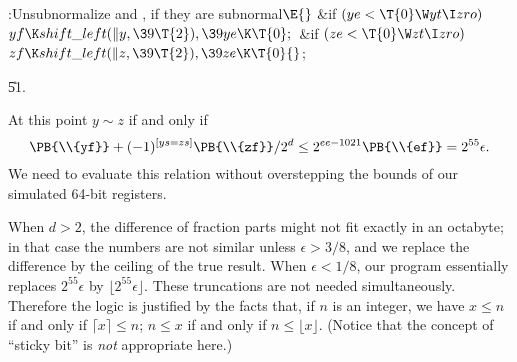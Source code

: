 \B{}:Unsubnormalize  and , if they are subnormal\X${}%
\E{}$\6
\&{if} ${}(\\{ye}<\T{0}\W\\{yt}\I\\{zro}){}$\1\5
${}\\{yf}\K\\{shift\_left}(\|y,\39\T{2}),\39\\{ye}\K\T{0};{}$\2\6
\&{if} ${}(\\{ze}<\T{0}\W\\{zt}\I\\{zro}){}$\1\5
${}\\{zf}\K\\{shift\_left}(\|z,\39\T{2}),\39\\{ze}\K\T{0}{}$;\2\par
\U51.\fi

At this point $y\sim z$ if and only if
$$\PB{\\{yf}}+(-1)^{[ys=zs]}\PB{\\{zf}}/2^d\le 2^{ee-1021}\PB{\\{ef}}=2^{55}%
\epsilon.$$
We need to evaluate this relation without overstepping the bounds of
our simulated 64-bit registers.

When $d>2$, the difference of fraction parts might not fit exactly
in an octabyte;
in that case the numbers are not similar unless $\epsilon>3/8$,
and we replace the difference by the ceiling of the
true result. When $\epsilon<1/8$, our program essentially replaces
$2^{55}\epsilon$ by $\lfloor2^{55}\epsilon\rfloor$. These
truncations are not needed simultaneously. Therefore the logic
is justified by the facts that, if $n$ is an integer, we have
$x\le n$ if and only if $\lceil x\rceil\le n$;
$n\le x$ if and only if $n\le\lfloor x\rfloor$. (Notice that the
concept of ``sticky bit'' is {\it not\/} appropriate here.)


